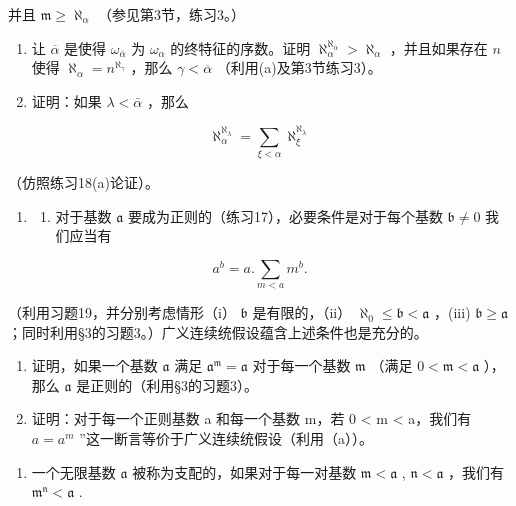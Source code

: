 并且 \(\mathfrak{m} \geqslant \aleph_{\alpha}\) （参见第3节，练习3。）

\begin{enumerate}
\def\labelenumi{(\alph{enumi})}
\setcounter{enumi}{1}
\item
  让 \(\overline{\alpha}\) 是使得 \(\omega_{\overline{\alpha}}\) 为 \(\omega_{\alpha}\) 的终特征的序数。证明 \(\aleph_{\alpha}^{\aleph_{\overline{\alpha}}} > \aleph_{\alpha}\) ，并且如果存在 \(n\) 使得 \(\aleph_{\alpha} = n^{\aleph_{\gamma}}\) ，那么 \(\gamma < \overline{\alpha}\) （利用(a)及第3节练习3）。
\item
  证明：如果 \(\lambda < \bar{\alpha}\) ，那么
\end{enumerate}

\[
\aleph_ {\alpha} ^ {\aleph_ {\lambda}} = \sum_ {\xi <   \alpha} \aleph_ {\xi} ^ {\aleph_ {\lambda}}
\]

（仿照练习18(a)论证）。

\begin{enumerate}
\def\labelenumi{\arabic{enumi}.}
\setcounter{enumi}{19}
\tightlist
\item
  \begin{enumerate}
  \def\labelenumii{(\alph{enumii})}
  \tightlist
  \item
    对于基数 \(\mathfrak{a}\) 要成为正则的（练习17），必要条件是对于每个基数 \(\mathfrak{b} \neq 0\) 我们应当有
  \end{enumerate}
\end{enumerate}

\[
a ^ {b} = a. \sum_ {m <   a} m ^ {b}.
\]

（利用习题19，并分别考虑情形（i） \(\mathfrak{b}\) 是有限的，（ii） \(\aleph_0 \leqslant \mathfrak{b} < \mathfrak{a}\) ，(iii) \(\mathfrak{b} \geqslant \mathfrak{a}\) ；同时利用§3的习题3。）广义连续统假设蕴含上述条件也是充分的。

\begin{enumerate}
\def\labelenumi{(\alph{enumi})}
\setcounter{enumi}{1}
\item
  证明，如果一个基数 \(\mathfrak{a}\) 满足 \(\mathfrak{a}^{\mathfrak{m}} = \mathfrak{a}\) 对于每一个基数 \(\mathfrak{m}\) （满足 \(0 < \mathfrak{m} < \mathfrak{a}\) ），那么 \(\mathfrak{a}\) 是正则的（利用§3的习题3）。
\item
  证明：对于每一个正则基数 a 和每一个基数 m，若 0 \textless{} m \textless{} a，我们有 \(a = a^{m}\) ''这一断言等价于广义连续统假设（利用（a））。
\end{enumerate}

\begin{enumerate}
\def\labelenumi{\arabic{enumi}.}
\setcounter{enumi}{20}
\tightlist
\item
  一个无限基数 \(\mathfrak{a}\) 被称为支配的，如果对于每一对基数 \(\mathfrak{m} < \mathfrak{a}\) , \(\mathfrak{n} < \mathfrak{a}\) ，我们有 \(\mathfrak{m}^{\mathfrak{n}} < \mathfrak{a}\) .
\end{enumerate}

